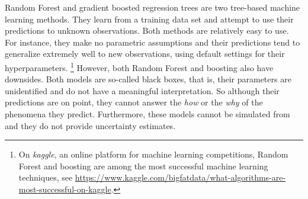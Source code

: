 \documentclass[a4paper,usenames,dvipsnames]{article}
\newenvironment{revision}{\color{teal}}{\color{black}}
\begin{document}
\begin{revision}
Random Forest \cite{breiman2001random} and gradient boosted regression trees \cite{Friedman2001greedy} are two tree-based machine learning methods.
They learn from a training data set and attempt to use their predictions to unknown observations.
Both methods are relatively easy to use.
For instance, they make no parametric assumptions and their predictions tend to generalize extremely well to new observations, using default settings for their hyperparameters.%
\footnote{\begin{revision}On \emph{kaggle}, an online platform for machine learning competitions, Random Forest and boosting are among the most successful machine learning techniques, see \url{https://www.kaggle.com/bigfatdata/what-algorithms-are-most-successful-on-kaggle}.\end{revision}}
However, both Random Forest and boosting also have downsides.
Both models are so-called black boxes, that is, their parameters are unidentified and do not have a meaningful interpretation. So although their predictions are on point, they cannot answer the \emph{how} or the \emph{why} of the phenomena they predict. Furthermore, these models cannot be simulated from and they do not provide uncertainty estimates.%
\end{revision}
\end{document}
